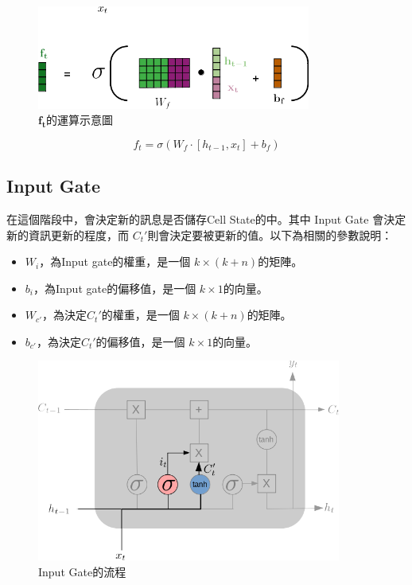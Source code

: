 \begin{figure}[H]
	\centering
	\includegraphics[width=9cm]{./pic/1hRe7Dz4.png}
	\caption{\(\mathbf{f_t}\)的運算示意圖}
	\label{fig:ForgetGateCalculate}
\end{figure}

\begin{equation}
	\label{eqn:ForgetGateCalculate}
	f_t = \sigma(W_f\cdot[h_{t-1},x_t]+b_f)
\end{equation}


\subsection{Input Gate}

在這個階段中，會決定新的訊息是否儲存Cell State的中。其中 Input Gate 會決定新的資訊更新的程度，而 \(C_t'\)則會決定要被更新的值。以下為相關的參數說明：


\begin{itemize}

	\item 
		\(W_i\)，為Input gate的權重，是一個 \(k \times (k+n)\)的矩陣。

	\item 
		\(b_i\)，為Input gate的偏移值，是一個 \(k \times 1\)的向量。

	\item 
		\(W_{c'}\)，為決定\(C_t'\)的權重，是一個 \(k \times (k+n)\)的矩陣。

	\item 
		\(b_{c'}\)，為決定\(C_t'\)的偏移值，是一個 \(k \times 1\)的向量。

\end{itemize}


\begin{figure}[H]
	\centering
	\includegraphics[width=10cm]{./pic/Htq3Iron.png}
	\caption{Input Gate的流程}
	\label{fig:InputGate}
\end{figure}


